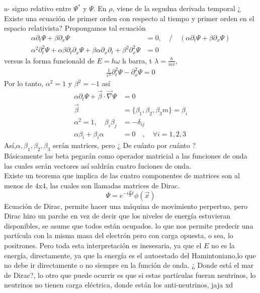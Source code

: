 \documentclass[../main.tex]{subfiles}
\begin{document}
a- signo relativo entre $\Psi^*$ y $\Psi$. En $\rho$, viene de la segudna derivada temporal  ¿ Existe una ecuación de primer orden con respecto al tiempo y primer orden en el espacio relativista? Propongamos tal ecuación
\begin{align*}
  \alpha \partial_t \Psi + \beta \partial_x \Psi  & = 0 , \quad / \quad \left( \alpha \partial_t \Psi + \beta \partial_x \Psi \right) \\
  \alpha^2 \partial^2_t\Psi + \alpha\beta \partial_t \partial_x \Psi + \beta \alpha \partial_x \partial_t + \beta^2 \partial^2_x \Psi  & = 0 
\end{align*}
versus la forma funcionald de $E=h\omega$ h barra,  t $\lambda = \frac{h}{mv}$, 
\begin{align*}
  \frac{1}{c^2} \partial^2_t\Psi - \partial^2_x \Psi = 0
\end{align*}
Por lo tanto, $\alpha^2=1$ y $\beta^2=-1$  así
\begin{align*}
 \alpha\partial_t \Psi + \vec{\beta} \cdot \vec{\nabla} \Psi &= 0 \\
  \vec{\beta} &= \{ \beta_1 , \beta_2 , \beta_3m\} = \beta_i \\ 
  \alpha^2=1 , \quad \beta_i \beta_j &= -\delta_{ij} \\
  \alpha\beta_i + \beta_i \alpha &= 0 \quad ,\quad \forall i = 1,2,3 
\end{align*}
Así,$\alpha, \beta_1, \beta_2, \beta_3$ serán matrices, pero ¿ De cuánto por cuánto ? \\ Básicamente las beta pegarán como operador matricial a las funciones de onda las cuales serán vectores  así saldrán cuatro fuciones de onda. \\
Existe un teorema que implica de las cuatro componentes de matrices son al menos de 4x4, las cuales son llamadas matrices de Dirac. 
\begin{equation}
  \Psi = e^{-i\frac{E}{h}t}\phi(\vec{x})
\end{equation}
Ecuación de Dirac, permite hacer una máquina de movimiento perpertuo, pero Dirac hizo un parche
en vez de decir que los niveles de energía estuvieran disponibles, se asume que todos están ocupados. lo que nos permite predecir una partícula con la misma masa del electrón pero con carga opuesta, o sea, lo positrones. Pero toda esta interpretación es inesesaria, ya que el $E$ no es la energía, directamente, ya que la energía es el autoestado del Hamintoniano,lo que no debe ir directamente o no siempre en la función de onda. ¿ Donde está el mar de Dirac?, lo otro que puede ocurrir es que si estas partículas fueran neutrinos, lo neutrinos no tienen carga eléctrica, donde están los anti-neutrinos, jaja xd  
\end{document}
